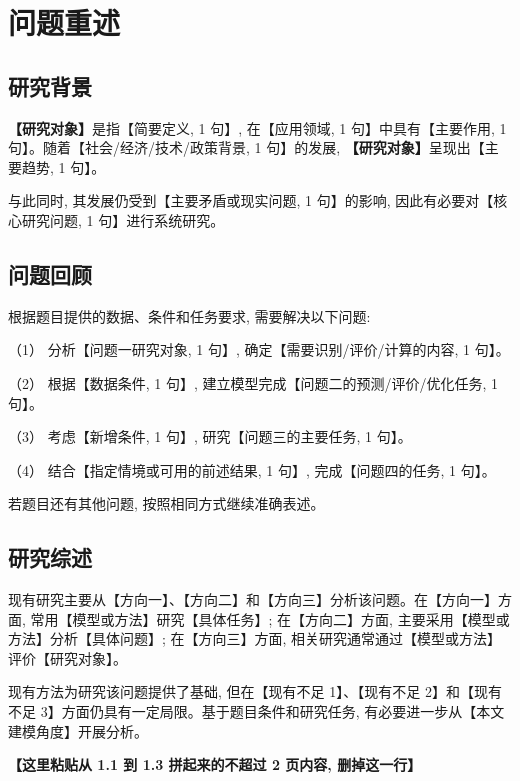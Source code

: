 
\section{问题重述}

\subsection{研究背景}

\textbf{【研究对象】}是指【简要定义, 1 句】, 在【应用领域, 1 句】中具有【主要作用, 1 句】。随着【社会/经济/技术/政策背景, 1 句】的发展, \textbf{【研究对象】}呈现出【主要趋势, 1 句】。

与此同时, 其发展仍受到【主要矛盾或现实问题, 1 句】的影响, 因此有必要对【核心研究问题, 1 句】进行系统研究。

\subsection{问题回顾}

根据题目提供的数据、条件和任务要求, 需要解决以下问题:

（1） 分析【问题一研究对象, 1 句】, 确定【需要识别/评价/计算的内容, 1 句】。

（2） 根据【数据条件, 1 句】, 建立模型完成【问题二的预测/评价/优化任务, 1 句】。

（3） 考虑【新增条件, 1 句】, 研究【问题三的主要任务, 1 句】。

（4） 结合【指定情境或可用的前述结果, 1 句】, 完成【问题四的任务, 1 句】。

若题目还有其他问题, 按照相同方式继续准确表述。

\subsection{研究综述}

现有研究主要从【方向一】、【方向二】和【方向三】分析该问题。在【方向一】方面, 常用【模型或方法】研究【具体任务】; 在【方向二】方面, 主要采用【模型或方法】分析【具体问题】; 在【方向三】方面, 相关研究通常通过【模型或方法】评价【研究对象】。

现有方法为研究该问题提供了基础, 但在【现有不足 1】、【现有不足 2】和【现有不足 3】方面仍具有一定局限。基于题目条件和研究任务, 有必要进一步从【本文建模角度】开展分析。

\textbf{【这里粘贴从 1.1 到 1.3 拼起来的不超过 2 页内容, 删掉这一行】}
